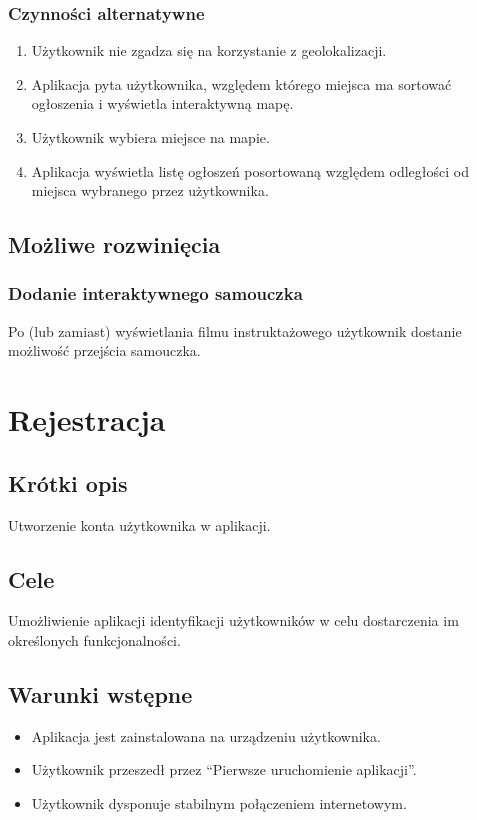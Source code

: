 \documentclass[12pt,a4paper,twoside]{article}
\begin{document}
    
    \subsubsection{Czynności alternatywne}
    
    
    \begin{enumerate}
        \item Użytkownik nie zgadza się na korzystanie z geolokalizacji.
        \item Aplikacja pyta użytkownika, względem którego miejsca ma sortować ogłoszenia i wyświetla interaktywną mapę.
        \item Użytkownik wybiera miejsce na mapie.
        \item Aplikacja wyświetla listę ogłoszeń posortowaną względem odległości od miejsca wybranego przez użytkownika.
    \end{enumerate}
    
    
    \subsection{Możliwe rozwinięcia}
    \subsubsection{Dodanie interaktywnego samouczka}
    Po (lub zamiast) wyświetlania filmu instruktażowego użytkownik dostanie możliwość przejścia samouczka.
    
    
    \section{Rejestracja}
    
    
    \subsection{Krótki opis}
    Utworzenie konta użytkownika w aplikacji.
    
    
    \subsection{Cele}
    Umożliwienie aplikacji identyfikacji użytkowników w celu dostarczenia im określonych funkcjonalności.
    
    
    \subsection{Warunki wstępne}
    \begin{itemize}
        \item Aplikacja jest zainstalowana na urządzeniu użytkownika.
        \item Użytkownik przeszedł przez ``Pierwsze uruchomienie aplikacji''.
        \item Użytkownik dysponuje stabilnym połączeniem internetowym.
    \end{itemize}
    
\end{document}
